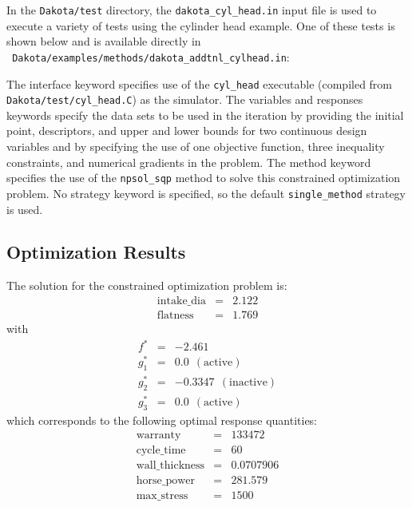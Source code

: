 In the \texttt{Dakota/test} directory, the
\texttt{dakota\_cyl\_head.in} input file is used to execute a variety
of tests using the cylinder head example. One of these tests is shown
below and is available directly in \\ {\tt
Dakota/examples/methods/dakota\_addtnl\_cylhead.in}:
\begin{center}
  \begin{small}
    \begin{bigbox}
    \end{bigbox}
  \end{small}
\end{center}

The interface keyword specifies use of the \texttt{cyl\_head}
executable (compiled from \texttt{Dakota/test/cyl\_head.C}) as the
simulator. The variables and responses keywords specify the data sets
to be used in the iteration by providing the initial point,
descriptors, and upper and lower bounds for two continuous design
variables and by specifying the use of one objective function, three
inequality constraints, and numerical gradients in the problem. The
method keyword specifies the use of the \texttt{npsol\_sqp} method to
solve this constrained optimization problem. No strategy keyword is
specified, so the default \texttt{single\_method} strategy is used.

\subsection{Optimization Results}\label{additional:cylinder:results}

The solution for the constrained optimization problem is:
\begin{eqnarray*}
    \mathrm{intake\_dia} &=& 2.122 \\
    \mathrm{flatness}    &=& 1.769
\end{eqnarray*}
with
\begin{eqnarray*}
      f^{\ast} &=& -2.461 \\
    g_1^{\ast} &=&  0.0    ~~\mathrm{(active)} \\
    g_2^{\ast} &=& -0.3347 ~~\mathrm{(inactive)} \\
    g_3^{\ast} &=&  0.0    ~~\mathrm{(active)}
\end{eqnarray*}
which corresponds to the following optimal response quantities:
\begin{eqnarray*}
    \mathrm{warranty}        &=& 133472 \\
    \mathrm{cycle\_time}     &=& 60 \\
    \mathrm{wall\_thickness} &=& 0.0707906 \\
    \mathrm{horse\_power}    &=& 281.579 \\
    \mathrm{max\_stress}     &=& 1500
\end{eqnarray*}

